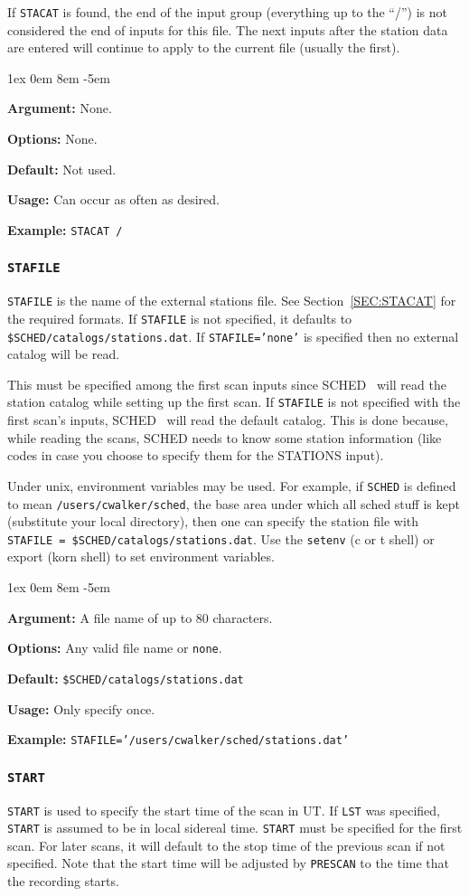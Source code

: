 \documentclass{report}
\newcommand{\schedb}{{\sc SCHED~}}
\newcommand{\rcwbox}[5]{
  \begin{list}{}{\parsep 1ex  \itemsep 0em
                 \leftmargin 8em  \itemindent -5em }
    \item {\bf Argument:} #1
    \item {\bf Options:}  #2
    \item {\bf Default:}  #3
    \item {\bf Usage:}    #4
    \item {\bf Example:}  #5
  \end{list}
}
\begin{document}
If {\tt STACAT} is found, the end of the input group (everything up to
the ``/'') is not considered the end of inputs for this file.  The
next inputs after the station data are entered will continue to apply
to the current file (usually the first).

\rcwbox
{None.}
{None.}
{Not used.}
{Can occur as often as desired.}
{{\tt STACAT /}}


\subsubsection{\label{MP:STAFILE}{\tt STAFILE}}

{\tt STAFILE} is the name of the external stations file. See
Section~\ref{SEC:STACAT} for the required formats. If {\tt STAFILE} is
not specified, it defaults to {\tt \$SCHED/catalogs/stations.dat}.  If
{\tt STAFILE='none'} is specified then no external catalog will be
read.

This must be specified among the first scan inputs since \schedb
will read the station catalog while setting up the first scan.  If
{\tt STAFILE} is not specified with the first scan's inputs, \schedb
will read the default catalog.  This is done because, while reading
the scans, SCHED needs to know some station information (like codes
in case you choose to specify them for the STATIONS input).

Under unix, environment variables may be used.  For example, if
{\tt SCHED} is defined to mean {\tt /users/cwalker/sched}, the
base area under which all sched stuff is kept (substitute your
local directory), then one can specify the station file with
{\tt STAFILE = \$SCHED/catalogs/stations.dat}.  Use the {\tt setenv}
(c or t shell) or export (korn shell) to set environment variables.

\rcwbox
{A file name of up to 80 characters.}
{Any valid file name or {\tt none}.}
{{\tt \$SCHED/catalogs/stations.dat}}
{Only specify once.}
{{\tt STAFILE='/users/cwalker/sched/stations.dat'}}


\subsubsection{\label{MP:START}{\tt START}}

{\tt START} is used to specify the start time of the scan in UT. If
{\tt LST} was specified, {\tt START} is assumed to be in local
sidereal time. {\tt START} must be specified for the first scan. For
later scans, it will default to the stop time of the previous scan if
not specified.  Note that the start time will be adjusted by
{\tt PRESCAN} to the time that the recording starts.
\end{document}
